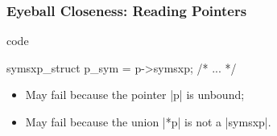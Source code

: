 \documentclass{beamer}
\begin{document}
\begin{frame}[fragile]
    \label{frame:reading:pointers}
    \frametitle{Eyeball Closeness: Reading Pointers}

    \begin{changemargin}{-5mm}{-5mm}

\begin{minipage}{.6\textwidth}
    {\Cn{} code}
\begin{ccode}
symsxp_struct p_sym = p->symsxp;
/* ... */
\end{ccode}
\end{minipage}
    \begin{minipage}{.45\textwidth}
    \begin{itemize}
        \item May fail because the pointer \mintedinlinespacebug\cinline|p| is unbound;
        \item May fail because the union \mintedinlinespacebug\cinline|*p| is not a \mintedinlinespacebug\cinline|symsxp|.
    \end{itemize}
    \end{minipage}

\vfill


\end{changemargin}
\end{frame}
\end{document}
